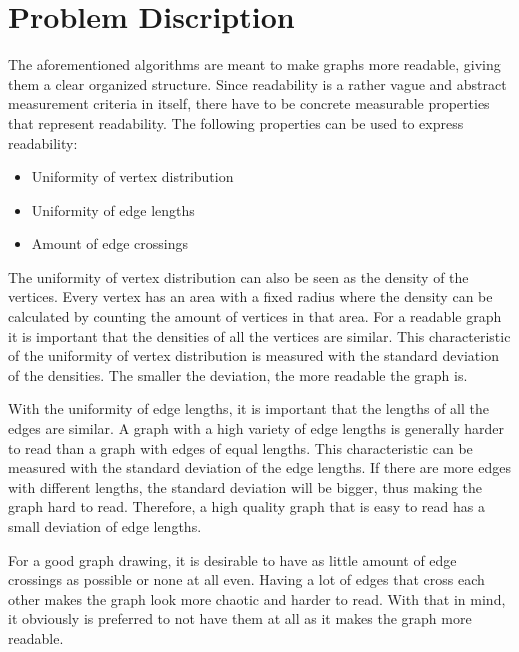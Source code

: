 \documentclass[a4paper,12pt]{article}
\begin{document}
  \section{Problem Discription}
    The aforementioned algorithms are meant to make graphs more readable, giving them a clear organized structure.
    Since readability is a rather vague and abstract measurement criteria in itself, there have to be concrete measurable properties that represent readability. 
    The following properties can be used to express readability: \cite{kobourov2012spring} 
    \begin{itemize}
      \item Uniformity of vertex distribution
      \item Uniformity of edge lengths 
      \item Amount of edge crossings
    \end{itemize}
    The uniformity of vertex distribution can also be seen as the density of the vertices.
    Every vertex has an area with a fixed radius where the density can be calculated by counting the amount of vertices in that area.
    For a readable graph it is important that the densities of all the vertices are similar.
    This characteristic of the uniformity of vertex distribution is measured with the standard deviation of the densities.
    The smaller the deviation, the more readable the graph is.

    With the uniformity of edge lengths, it is important that the lengths of all the edges are similar.
    A graph with a high variety of edge lengths is generally harder to read than a graph with edges of equal lengths.
    This characteristic can be measured with the standard deviation of the edge lengths.
    If there are more edges with different lengths, the standard deviation will be bigger, thus making the graph hard to read.
    Therefore, a high quality graph that is easy to read has a small deviation of edge lengths.
    
    For a good graph drawing, it is desirable to have as little amount of edge crossings as possible or none at all even.
    Having a lot of edges that cross each other makes the graph look more chaotic and harder to read.
    With that in mind, it obviously is preferred to not have them at all as it makes the graph more readable.
\end{document}
